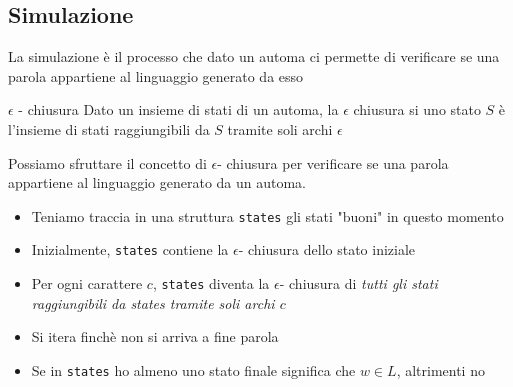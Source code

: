 %
\subsection{Simulazione}
La simulazione è il processo che dato un automa ci permette di verificare se una parola appartiene al linguaggio generato da esso
\begin{definizione}{$ \epsilon$ - chiusura}
	Dato un insieme di stati di un automa, la $ \epsilon $ chiusura si uno stato $ S $ è l'insieme di stati raggiungibili da $ S $ tramite soli archi $ \epsilon $
\end{definizione}

Possiamo sfruttare il concetto di $ \epsilon  $- chiusura per verificare se una parola appartiene al linguaggio generato da un automa.
\begin{itemize}
	\item Teniamo traccia in una struttura \verb|states| gli stati "buoni" in questo momento
	\item  Inizialmente, \verb|states| contiene la $ \epsilon  $- chiusura dello stato iniziale
	\item Per ogni carattere $ c $, \verb|states| diventa la $ \epsilon  $- chiusura di \textit{tutti gli stati raggiungibili da states tramite soli archi $ c $}
	\item Si itera finchè non si arriva a fine parola
	\item Se in \verb|states| ho almeno uno stato finale significa che $ w \in L $, altrimenti no
\end{itemize}
